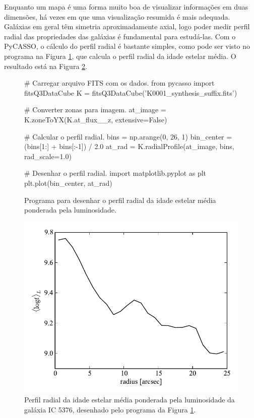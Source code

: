 Enquanto um mapa é uma forma muito boa de visualizar informações em duas
dimensões, há vezes em que uma visualização resumida é mais adequada. Galáxias
em geral têm simetria aproximadamente axial, logo poder medir perfil radial das
propriedades das galáxias é fundamental para estudá-las. Com o PyCASSO, o
cálculo do perfil radial é bastante simples, como pode ser visto no programa na
Figura \ref{fig:programaRadprofIdade}, que calcula o perfil radial da idade
estelar média. O resultado está na Figura \ref{fig:radprofIdade}.

\begin{figure}
\begin{python}
# Carregar arquivo FITS com os dados.
from pycasso import fitsQ3DataCube
K = fitsQ3DataCube('K0001_synthesis_suffix.fits')

# Converter zonas para imagem.
at_image = K.zoneToYX(K.at_flux__z, extensive=False)

# Calcular o perfil radial.
bins = np.arange(0, 26, 1)
bin_center = (bins[1:] + bins[:-1]) / 2.0
at_rad = K.radialProfile(at_image, bins, rad_scale=1.0)

# Desenhar o perfil radial.
import matplotlib.pyplot as plt
plt.plot(bin_center, at_rad)
\end{python}
	\caption[Programa para desenhar o perfil radial da idade estelar] {Programa
	para desenhar o perfil radial da idade estelar média ponderada pela
	luminosidade.}
	\label{fig:programaRadprofIdade}
\end{figure}

\begin{figure}
	\includegraphics{figuras/radprof-idade}
	\caption[Perfil radial da idade estelar média da galáxia IC 5376] {Perfil
	radial da idade estelar média ponderada pela luminosidade da galáxia IC
	5376, desenhado pelo programa da Figura \ref{fig:programaRadprofIdade}.}
	\label{fig:radprofIdade}
\end{figure}

